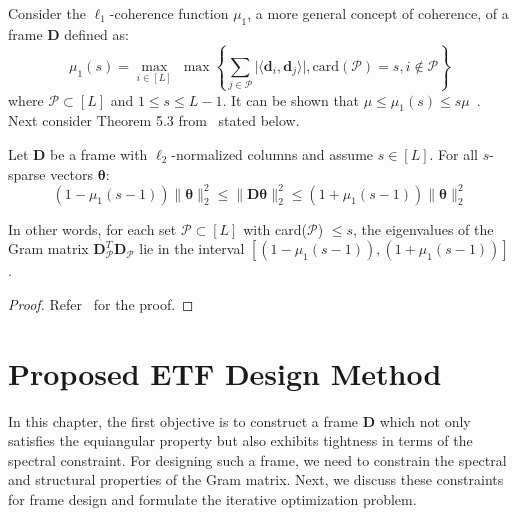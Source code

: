 Consider the $\ell_{1}$-coherence function $\mu_{1}$, a more general concept of coherence, of a frame $\bm{D}$ defined as:
\begin{equation}
    \label{eq: l1 coherence}
    \mu_{1}(s) = \underset{i\in \left[L \right]}{\max}\; \max\left\{\underset{j\in \bm{\mathcal{P}}}{\sum} \lvert\langle \bm{d}_{i},\bm{d}_{j} \rangle\rvert, \text{card}(\bm{\mathcal{P}}) = s,i \notin \bm{\mathcal{P}} \right\}
\end{equation}
where $\bm{\mathcal{P}} \subset \left[L\right]$ and $1 \leq s \leq L-1$. It can be shown that $\mu \leq \mu_{1}(s) \leq s \mu$~\cite{Foucart}. Next consider Theorem 5.3 from~\cite{Foucart} stated below.
%
\begin{theorem}
\label{th: RIP_L1}
Let $\bm{D}$ be a frame with $\ell_{2}$-normalized columns and assume $s\in [L]$. For all $s$-sparse vectors $\bm{\theta}$:
\begin{equation}
    \label{eq: RIP_mu_1}
     \left(1-\mu_{1}\left(s - 1\right)\right)\|\bm{\theta}\|_{2}^{2}\leq\|\bm{D}\bm{\theta}\|_{2}^{2}\leq\left(1+\mu_{1}\left(s - 1\right)\right)\|\bm{\theta}\|_{2}^{2}
\end{equation}
\end{theorem}
%
In other words, for each set $\bm{\mathcal{P}} \subset [L]$ with card($\bm{\mathcal{P}}$) $\leq s$, the eigenvalues of the Gram matrix $\bm{D}_{\bm{\mathcal{P}}}^{T}\bm{D}_{\bm{\mathcal{P}}}$ lie in the interval $[(1-\mu_{1}(s-1)), (1+\mu_{1}(s-1))]$. 
%
\begin{proof}
\label{proof: RIP_L1}
Refer~\cite{Foucart} for the proof.
\end{proof}
%
\section{Proposed ETF Design Method}
%
In this chapter, the first objective is to construct a frame $\bm{D}$ which not only satisfies the equiangular property but also exhibits tightness in terms of the spectral constraint. For designing such a frame, we need to constrain the spectral and structural properties of the Gram matrix. Next, we discuss these constraints for frame design and formulate the iterative optimization problem.
